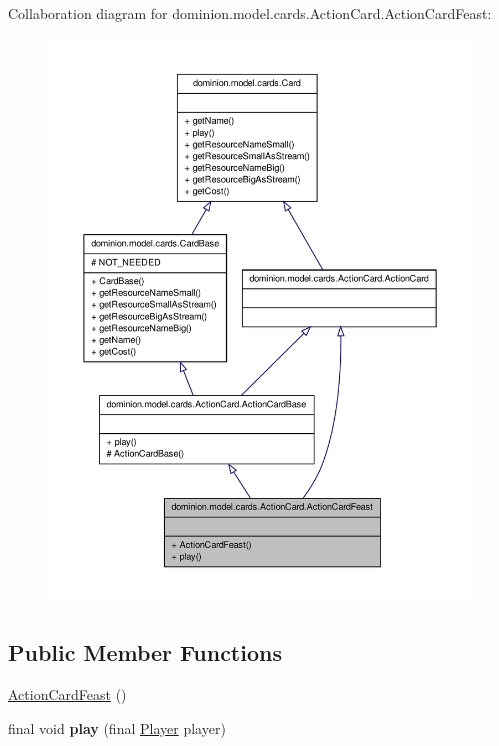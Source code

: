 \-Collaboration diagram for dominion.\-model.\-cards.\-Action\-Card.\-Action\-Card\-Feast\-:
\nopagebreak
\begin{figure}[H]
\begin{center}
\leavevmode
\includegraphics[width=350pt]{classdominion_1_1model_1_1cards_1_1ActionCard_1_1ActionCardFeast__coll__graph}
\end{center}
\end{figure}
\subsection*{\-Public \-Member \-Functions}
\begin{DoxyCompactItemize}
\item 
\hyperlink{classdominion_1_1model_1_1cards_1_1ActionCard_1_1ActionCardFeast_a7ee8928abb9315b2d09b719e6039ed43}{\-Action\-Card\-Feast} ()
\item 
\hypertarget{classdominion_1_1model_1_1cards_1_1ActionCard_1_1ActionCardFeast_af5a0eb65ee52e8f01b13310c121cd686}{final void {\bfseries play} (final \hyperlink{interfacedominion_1_1model_1_1Player}{\-Player} player)}\label{classdominion_1_1model_1_1cards_1_1ActionCard_1_1ActionCardFeast_af5a0eb65ee52e8f01b13310c121cd686}

\end{DoxyCompactItemize}


